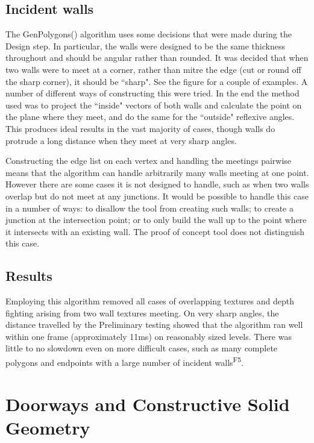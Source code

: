 \subsection{Incident walls}
\label{sec:meeting}
The GenPolygons() algorithm uses some decisions that were made during the Design step. In particular, the walls were designed to be the same thickness throughout and should be angular rather than rounded. It was decided that when two walls were to meet at a corner, rather than mitre the edge (cut or round off the sharp corner), it should be ``sharp". See the figure for a couple of examples. A number of different ways of constructing this were tried. In the end the method used was to project the ``inside" vectors of both walls and calculate the point on the plane where they meet, and do the same for the ``outside" reflexive angles. This produces ideal results in the vast majority of cases, though walls do protrude a long distance when they meet at very sharp angles. 

Constructing the edge list on each vertex and handling the meetings pairwise means that the algorithm can handle arbitrarily many walls meeting at one point. However there are some cases it is not designed to handle, such as when two walls overlap but do not meet at any junctions. It would be possible to handle this case in a number of ways: to disallow the tool from creating such walls; to create a junction at the intersection point; or to only build the wall up to the point where it intersects with an existing wall. The proof of concept tool does not distinguish this case.

\subsection{Results}
Employing this algorithm removed all cases of overlapping textures and depth fighting arising from two wall textures meeting. On very sharp angles, the distance travelled by the 
Preliminary testing showed that the algorithm ran well within one frame (approximately 11ms) on reasonably sized levels. There was little to no slowdown even on more difficult cases, such as many complete polygons and endpoints with a large number of incident walls\textsuperscript{F5}. 


\section{Doorways and Constructive Solid Geometry}
\label{sec:csg}

